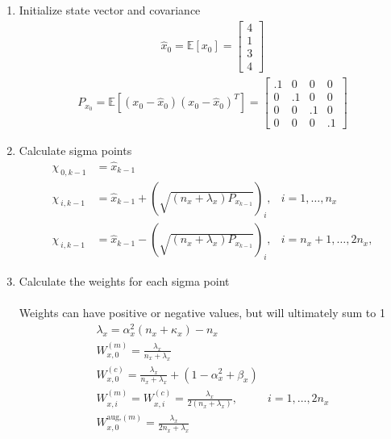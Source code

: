 \begin{enumerate}
    \item Initialize state vector and covariance
    \begin{align}
        \hat{x}_{0} = \mathbb{E}[x_{0}] = \begin{bmatrix}
           4 \\
           1 \\
           3 \\
           4
         \end{bmatrix} 
    \end{align}
    \begin{align}
        P_{x_{0}} = \mathbb{E}[(x_{0}-\hat{x}_{0})(x_{0}-\hat{x}_{0})^{T}] = \begin{bmatrix}
           .1 & 0 & 0 & 0 \\
           0 & .1 & 0 & 0 \\
           0 & 0 & .1 & 0 \\
           0 & 0 & 0 & .1
         \end{bmatrix} 
    \end{align}
    \item Calculate sigma points
    \begin{align}
        \chi_{\ 0,k-1} &= \hat{x}_{k-1} \\
        \chi_{\ i,k-1} &= \hat{x}_{k-1} + (\sqrt{(n_{x}+\lambda_{x})P_{x_{k-1}}})_{i}, &  i=1,\dots,n_{x} \\
        \chi_{\ i,k-1} &= \hat{x}_{k-1} - (\sqrt{(n_{x}+\lambda_{x})P_{x_{k-1}}})_{i},  &  i=n_{x}+1,\dots,2n_{x},
    \end{align}
    \item Calculate the weights for each sigma point \\ \\
    Weights can have positive or negative values, but will ultimately sum to 1 \cite{article6}
    \begin{align}
        \lambda_{x} = \alpha_{x}^{2}(n_{x}+\kappa_{x})-n_{x} \\
        W^{(m)}_{x,0} = \frac{\lambda_{x}}{n_{x}+ \lambda_{x} } \\
        W^{(c)}_{x,0} = \frac{\lambda_{x}}{n_{x}+ \lambda_{x} } + (1 - \alpha^{2}_{x} + \beta_{x}) \\
        W^{(m)}_{x,i} = W^{(c)}_{x,i} = \frac{\lambda_{x}}{2(n_{x}+ \lambda_{x}) }, & i=1,\dots,2n_{x} \\
        W^{\text{aug,}(m)}_{x,0} = \frac{\lambda_{x}}{2n_{x}+ \lambda_{x} } \\

\end{align}
\end{enumerate}
